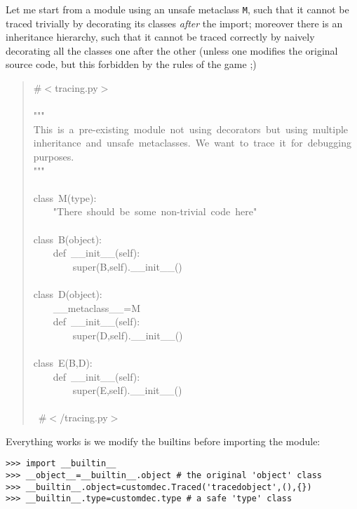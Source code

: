\documentclass[11pt,english]{article}
\begin{document}
Let me start from a module using an unsafe metaclass \texttt{M}, such that it
cannot be traced trivially by decorating its classes \emph{after} the import;
moreover there is an inheritance hierarchy, such that it cannot be
traced correctly by naively decorating all the classes one after the
other (unless one modifies the original source code, but this forbidden
by the rules of the game ;)
\begin{quote}
\begin{ttfamily}\begin{flushleft}
\mbox{{\#}{$<$}tracing.py{$>$}}\\
\mbox{}\\
\mbox{"""}\\
\mbox{This~is~a~pre-existing~module~not~using~decorators~but~using~multiple}\\
\mbox{inheritance~and~unsafe~metaclasses.~We~want~to~trace~it~for~debugging~}\\
\mbox{purposes.}\\
\mbox{"""}\\
\mbox{~}\\
\mbox{class~M(type):~}\\
\mbox{~~~~"There~should~be~some~non-trivial~code~here"}\\
\mbox{}\\
\mbox{class~B(object):~}\\
\mbox{~~~~def~{\_}{\_}init{\_}{\_}(self):}\\
\mbox{~~~~~~~~super(B,self).{\_}{\_}init{\_}{\_}()}\\
\mbox{}\\
\mbox{class~D(object):~}\\
\mbox{~~~~{\_}{\_}metaclass{\_}{\_}=M}\\
\mbox{~~~~def~{\_}{\_}init{\_}{\_}(self):}\\
\mbox{~~~~~~~~super(D,self).{\_}{\_}init{\_}{\_}()}\\
\mbox{}\\
\mbox{class~E(B,D):}\\
\mbox{~~~~def~{\_}{\_}init{\_}{\_}(self):}\\
\mbox{~~~~~~~~super(E,self).{\_}{\_}init{\_}{\_}()}\\
\mbox{}\\
\mbox{~{\#}{$<$}/tracing.py{$>$}}
\end{flushleft}\end{ttfamily}
\end{quote}

Everything works is we modify the builtins before importing the module:
\begin{verbatim}>>> import __builtin__
>>> __object__=__builtin__.object # the original 'object' class
>>> __builtin__.object=customdec.Traced('tracedobject',(),{}) 
>>> __builtin__.type=customdec.type # a safe 'type' class\end{verbatim}
\end{document}
